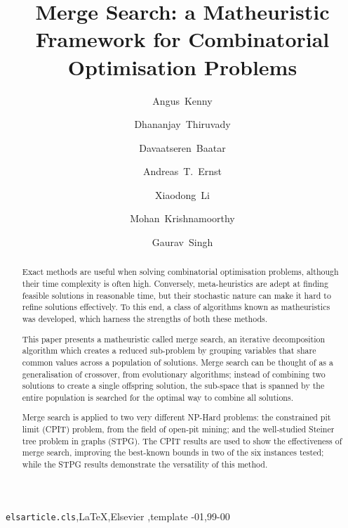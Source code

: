 \documentclass[preprint]{elsarticle}
\begin{document}
\begin{frontmatter}

\title{Merge Search: a Matheuristic Framework for Combinatorial Optimisation Problems}

\author[unsw]{Angus~Kenny}
\author[deak]{Dhananjay~Thiruvady}
\author[mon]{Davaatseren~Baatar}
\author[mon]{Andreas~T.~Ernst}
\author[rmit]{Xiaodong~Li}
\author[uq]{Mohan~Krishnamoorthy}
\author[bhp]{Gaurav~Singh}%

\address[unsw]{School of Engineering and Information Technology, University of New South Wales, Canberra ACT, Australia}
\address[deak]{School of Information Technology, Deakin University, Geelong VIC, Australia}
\address[mon]{School of Mathematics, Monash University, Clayton VIC, Australia}
\address[rmit]{School of Computing Technologies, RMIT University, Melbourne VIC, Australia}
\address[uq]{School of Information Technology and Electrical Engineering, The University of Queensland, St Lucia QLD, Australia}
\address[bhp]{BHP, Perth WA, Australia}

\begin{abstract}
Exact methods are useful when solving combinatorial optimisation problems, although their time complexity is often high. Conversely, meta-heuristics are adept at finding feasible solutions in reasonable time, but their stochastic nature can make it hard to refine solutions effectively. To this end, a class of algorithms known as matheuristics was developed, which harness the strengths of both these methods.

This paper presents a matheuristic called merge search, an iterative decomposition algorithm which creates a reduced sub-problem by grouping variables that share common values across a population of solutions. Merge search can be thought of as a generalisation of crossover, from evolutionary algorithms; instead of combining two solutions to create a single offspring solution, the sub-space that is spanned by the entire population is searched for the optimal way to combine all solutions.

Merge search is applied to two very different NP-Hard problems: the constrained pit limit (CPIT) problem, from the field of open-pit mining; and the well-studied Steiner tree problem in graphs (STPG). The CPIT results are used to show the effectiveness of merge search, improving the best-known bounds in two of the six instances tested; while the STPG results demonstrate the versatility of this method. 
\end{abstract}

\begin{keyword}
\texttt{elsarticle.cls}\sep \LaTeX\sep Elsevier \sep template
-01\sep  99-00
\end{keyword}

\end{frontmatter}
\end{document}
